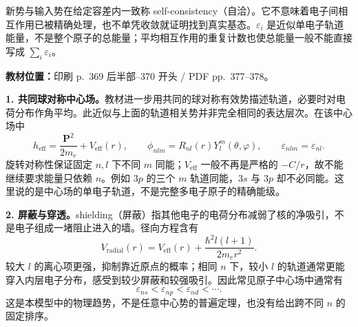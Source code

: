 \begin{center}
\end{center}

新势与输入势在给定容差内一致称 self-consistency（自洽）。它不意味着电子间相互作用已被精确处理，也不单凭收敛就证明找到真实基态。$\varepsilon_i$ 是近似单电子轨道能量，不是整个原子的总能量；平均相互作用的重复计数也使总能量一般不能直接写成 $\sum_i\varepsilon_i$。


\textbf{教材位置：}印刷 p.~369 后半部--370 开头 / PDF pp.~377--378。

\textbf{1. 共同球对称中心场。}教材进一步用共同的球对称有效势描述轨道，必要时对电荷分布作角平均。此近似与上面的轨道相关势并非完全相同的表达层次。在该中心场中
\begin{equation}
  h_{\mathrm{eff}}=\frac{\mathbf P^2}{2m_e}+V_{\mathrm{eff}}(r),
  \qquad
  \phi_{nlm}=R_{nl}(r)Y_l^m(\theta,\varphi),\qquad
  \boxed{\varepsilon_{nlm}=\varepsilon_{nl}.}
\end{equation}
旋转对称性保证固定 $n,l$ 下不同 $m$ 同能；$V_{\mathrm{eff}}$ 一般不再是严格的 $-C/r$，故不能继续要求能量只依赖 $n$。例如 $3p$ 的三个 $m$ 轨道同能，$3s$ 与 $3p$ 却不必同能。这里说的是中心场的单电子轨道，不是完整多电子原子的精确能级。

\textbf{2. 屏蔽与穿透。}shielding（屏蔽）指其他电子的电荷分布减弱了核的净吸引，不是电子组成一堵阻止进入的墙。径向方程含有
\begin{equation}
  V_{\mathrm{radial}}(r)=V_{\mathrm{eff}}(r)
      +\frac{\hbar^2l(l+1)}{2m_er^2}.
\end{equation}
较大 $l$ 的离心项更强，抑制靠近原点的概率；相同 $n$ 下，较小 $l$ 的轨道通常更能穿入内层电子分布，感受到较少屏蔽和较强吸引。因此常见原子中心场中通常有
\begin{equation}
  \varepsilon_{ns}<\varepsilon_{np}<\varepsilon_{nd}<\cdots.
\end{equation}
这是本模型中的物理趋势，不是任意中心势的普遍定理，也没有给出跨不同 $n$ 的固定排序。

